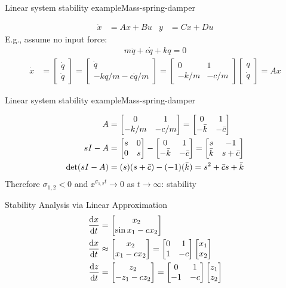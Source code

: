 \documentclass[10pt]{beamer-control}
\begin{document}
\begin{frame}{Linear system stability example}{Mass-spring-damper}

  \begin{align}
    \dot x &= Ax + Bu & y &= Cx + Du
  \end{align}
  E.g., assume no input force:
  \begin{align}
    m\ddot q + c\dot q + kq = 0
  \end{align}
  \begin{align}
    \dot x &= \begin{bmatrix}\dot q\\\ddot q\end{bmatrix} = \begin{bmatrix}\dot q\\- kq/m - c\dot q/m\end{bmatrix}
    = \begin{bmatrix}0 & 1\\- k/m & - c/m\end{bmatrix}\begin{bmatrix} q\\\dot q\end{bmatrix} = Ax
  \end{align}

\end{frame}

\begin{frame}{Linear system stability example}{Mass-spring-damper}


  \begin{align}
    A &= \begin{bmatrix}0 & 1\\- k/m & - c/m\end{bmatrix} = \begin{bmatrix}0 & 1\\- \bar k & - \bar c\end{bmatrix} \\
    sI-A &= \begin{bmatrix}s & 0\\0 & s\end{bmatrix} - \begin{bmatrix}0 & 1\\- \bar k & - \bar c\end{bmatrix} = \begin{bmatrix}s & -1\\ \bar k & s+ \bar c\end{bmatrix} \\
    \det(sI-A) &= (s)(s+ \bar c) - (-1)(\bar k) = s^2 + \bar c s  + \bar k
  \end{align}
  Therefore $\sigma_{1,2}<0$ and $\ee^{\sigma_{1,2} t}\to 0$ as $t\to\infty$: stability

\end{frame}



\begin{frame}{Stability Analysis via Linear Approximation}
  \begin{align}
    \frac{\mathrm{d} x}{\mathrm{d} t} &= \begin{bmatrix}x_2\\\sin x_1-c x_2\end{bmatrix} \\
    \frac{\mathrm{d} x}{\mathrm{d} t} &\approx \begin{bmatrix}x_2\\ x_1-c x_2\end{bmatrix} = \begin{bmatrix}0 & 1\\1 & -c\end{bmatrix}\begin{bmatrix}x_1\\x_2\end{bmatrix} \\
    \frac{\mathrm{d} z}{\mathrm{d} t} &= \begin{bmatrix}z_2\\ -z_1-c z_2\end{bmatrix} = \begin{bmatrix}0 & 1\\-1 & -c\end{bmatrix}\begin{bmatrix}z_1\\z_2\end{bmatrix}
  \end{align}
\end{frame}
\end{document}
